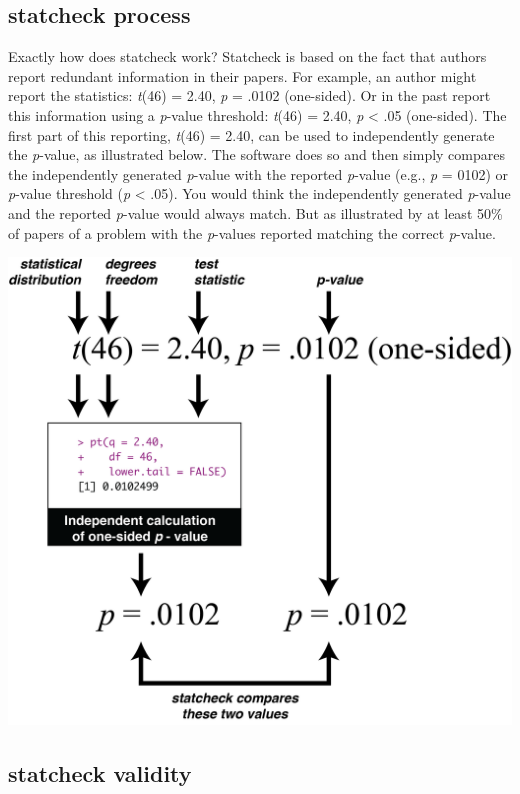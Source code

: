 \documentclass[
]{krantz}
\begin{document}
\hypertarget{statcheck-process}{%
\subsection{statcheck process}\label{statcheck-process}}

Exactly how does statcheck work? Statcheck is based on the fact that authors report redundant information in their papers. For example, an author might report the statistics: \emph{t}(46) = 2.40, \emph{p} = .0102 (one-sided). Or in the past report this information using a \emph{p}-value threshold: \emph{t}(46) = 2.40, \emph{p} \textless{} .05 (one-sided). The first part of this reporting, \emph{t}(46) = 2.40, can be used to independently generate the \emph{p}-value, as illustrated below. The software does so and then simply compares the independently generated \emph{p}-value with the reported \emph{p}-value (e.g., \emph{p} = 0102) or \emph{p}-value threshold (\emph{p} \textless{} .05). You would think the independently generated \emph{p}-value and the reported \emph{p}-value would always match. But as illustrated by \citep{nuijten2016prevalence} at least 50\% of papers of a problem with the \emph{p}-values reported matching the correct \emph{p}-value.

\includegraphics[width=0.8\linewidth]{ch_tools/images/statcheck_process}

\hypertarget{statcheck-validity}{%
\subsection{statcheck validity}\label{statcheck-validity}}
\end{document}
